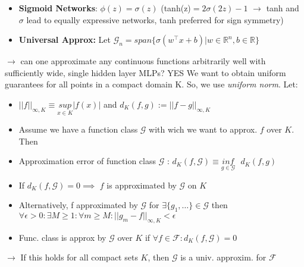 \begin{itemize}
    \item \textbf{Sigmoid Networks}: \(\phi(z)= \sigma(z)\) (tanh(z)\(=2\sigma(2z)-1\) \(\rightarrow\) tanh and \(\sigma\) lead to equally expressive networks, tanh preferred for sign symmetry)
    \item \textbf{Universal Approx:} Let \(\mathcal{G}_n=span\{\sigma(w^\top x +b) | w \in \mathbb{R}^n,b\in \mathbb{R}\}\) 
\end{itemize}
\(\rightarrow\) can one approximate any continuous functions arbitrarily well with sufficiently wide, single hidden layer MLPs? YES
We want to obtain uniform guarantees for all points in a compact domain K. So, we use \textit{uniform norm}. Let:
\begin{itemize}
    \item \(||f||_{\infty,K} \equiv \underset{x \in K}{sup}|f(x)|\) and \(d_K(f,g) := ||f-g||_{\infty,K}\)
    \item Assume we have a function class \(\mathcal{G}\) with wich we want to approx. \(f\) over \(K\). Then
    \item Approximation error of function class \(\mathcal{G}\) : \(d_K(f,\mathcal{G})\equiv \underset{g\in \mathcal{G}}{inf} \text{ } d_K(f,g)\) 
    \item If \(d_K(f,\mathcal{G})=0\implies\) $f$ is approximated by $\mathcal{G}$ on $K$
    \item  Alternatively, f approximated by \(\mathcal{G}\) for \(\exists \{g_1,\dots\}\in \mathcal{G}\)  then \( \forall \epsilon >0: \exists M\geq 1: \forall m \geq M: ||g_m-f||_{\infty,K} < \epsilon\)
    \item Func. class is approx by \(\mathcal{G}\) over \(K\) if \(\forall f\in \mathcal{F}:d_K(f,\mathcal{G})=0\)
\end{itemize}
$\rightarrow$ If this holds for all compact sets \(K\), then  $\mathcal{G}$ is a univ. approxim. for \(\mathcal{F}\)
